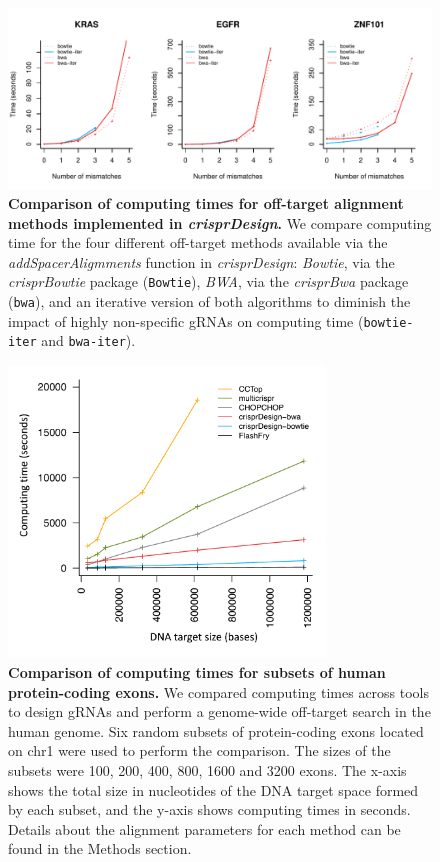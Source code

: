 \documentclass[pdftex,english,10pt]{article}
\begin{document}
{%
\begin{figure}[!h]
\centering
\includegraphics[width=1\textwidth]{analyses/offtargets/figures/offtarget_comparison.pdf}
  \caption{\textbf{Comparison of computing times for off-target alignment methods implemented in \textit{crisprDesign}.} 
  We compare computing time for the four different off-target methods available via the  \textit{addSpacerAligmments} function in \textit{crisprDesign}: \textit{Bowtie}, via the \textit{crisprBowtie} package (\texttt{Bowtie}), \textit{BWA}, via the \textit{crisprBwa} package (\texttt{bwa}), and an iterative version of both algorithms to diminish the impact of highly non-specific gRNAs on computing time (\texttt{bowtie-iter} and \texttt{bwa-iter}).
  }
  \label{suppfig:offtargets}
\end{figure}


\begin{figure}[!h]
\centering
\includegraphics[width=0.75\textwidth]{figures/speed/speedAcrossTools.pdf}
  \caption{\textbf{Comparison of computing times for subsets of human protein-coding exons.} 
We compared computing times across tools to design gRNAs and perform a genome-wide off-target search in the human genome. 
Six random subsets of protein-coding exons located on chr1 were used to perform the comparison. The sizes of the subsets were 100, 200, 400, 800, 1600 and 3200 exons.
The x-axis shows the total size in nucleotides of the DNA target space formed by each subset, and the y-axis shows computing times in seconds. Details about the alignment parameters for each method can be found in the Methods section. }
  \label{suppfig:speed}
\end{figure}





}
\end{document}

